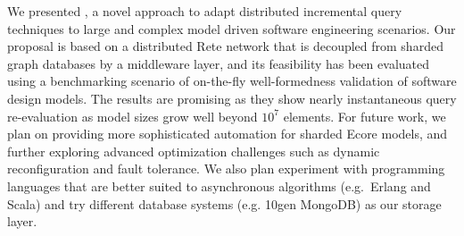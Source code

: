 We presented \iqd{}, a novel approach to adapt distributed incremental query techniques to large and complex model driven software engineering scenarios. Our proposal is based on a distributed Rete network that is decoupled from sharded graph databases by a middleware layer, and its feasibility has been evaluated using a benchmarking scenario of on-the-fly well-formedness validation of software design models. The results are promising as they show nearly instantaneous query re-evaluation as model sizes grow well beyond $10^7$ elements.
For future work, we plan on providing more sophisticated automation for sharded Ecore models, and further exploring advanced optimization challenges such as dynamic reconfiguration and fault tolerance.
We also plan experiment with programming languages that are better suited to asynchronous algorithms (e.g.\ Erlang and Scala) and try different database systems (e.g. 10gen MongoDB) as our storage layer.

